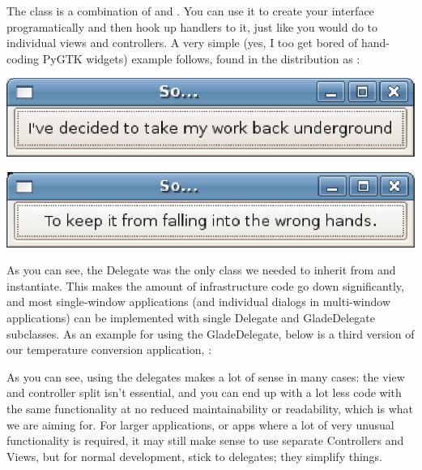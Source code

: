 \documentclass[a4paper]{howto}
\begin{document}
The  class is a combination of  and
. You can use it to create your interface
programatically and then hook up handlers to it, just like you would do
to individual views and controllers. A very simple (yes, I too get bored
of hand-coding PyGTK widgets) example follows, found in the distribution
as :

\begin{center}
\includegraphics[scale=0.905]{images/simple2.eps}
\end{center}



\begin{center}
\includegraphics[scale=0.905]{images/simple3.eps}
\end{center}

As you can see, the Delegate was the only class we needed to inherit
from and instantiate. This makes the amount of infrastructure code go
down significantly, and most single-window applications (and individual
dialogs in multi-window applications) can be implemented with single
Delegate and GladeDelegate subclasses. As an example for using the
GladeDelegate, below is a third version of our temperature conversion
application, :



As you can see, using the delegates makes a lot of sense in many cases:
the view and controller split isn't essential, and you can end up
with a lot less code with the same functionality at no reduced
maintainability or readability, which is what we are aiming for. For
larger applications, or apps where a lot of very unusual functionality
is required, it may still make sense to use separate Controllers and
Views, but for normal development, stick to delegates; they simplify
things.
\end{document}
